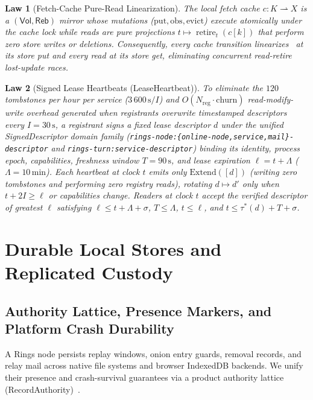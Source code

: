 \documentclass[journal]{IEEEtran}
\newtheorem{law}{Law}
\DeclareRobustCommand{\code}[1]{{\ttfamily\renewcommand{\_}{\textunderscore\allowbreak}#1}}
\begin{document}
\begin{law}[Fetch-Cache Pure-Read Linearization]\label{law:cache-linear}
The local fetch cache $c:K\rightharpoonup X$ is a $(\mathsf{Vol},\mathsf{Reb})$
mirror whose mutations ($\mathrm{put},\mathrm{obs},\mathrm{evict}$) execute
atomically under the cache lock while reads are pure projections
$t\mapsto\operatorname{retire}_t(c[k])$ that perform zero store writes or
deletions.  Consequently, every cache transition linearizes~\cite{HerlihyWing1990}
at its store put and every read at its store get, eliminating concurrent
read-retire lost-update races.
\end{law}

\begin{law}[Signed Lease Heartbeats (\code{LeaseHeartbeat})]\label{law:lease-heartbeat}
To eliminate the $120$ tombstones per hour per service ($3\,600\,\mathrm{s}/I$) and $O(N_{\mathrm{reg}}\cdot\mathrm{churn})$ read-modify-write overhead generated
when registrants overwrite timestamped descriptors every $I=30\,\mathrm{s}$,
a registrant signs a fixed lease descriptor $d$ under the unified \code{SignedDescriptor}
domain family (\texttt{rings-node:\allowbreak\{online-node,\allowbreak service,\allowbreak mail\}-descriptor} and
\texttt{rings-turn:service-descriptor}) binding its
identity, process epoch, capabilities, freshness window $T=90\,\mathrm{s}$, and
lease expiration $\ell=t+\Lambda$ ($\Lambda=10\,\mathrm{min}$).  Each heartbeat at
clock $t$ emits only $\mathrm{Extend}([d])$ (writing zero tombstones and
performing zero registry reads), rotating $d\mapsto d'$ only when $t+2I\ge\ell$
or capabilities change.  Readers at clock $t$ accept the verified descriptor of
greatest $\ell$ satisfying $\ell\le t+\Lambda+\sigma$, $T\le\Lambda$, $t\le\ell$,
and $t\le\tau^*(d)+T+\sigma$.
\end{law}

\section{Durable Local Stores and Replicated Custody}\label{sec:durable}

\subsection{Authority Lattice, Presence Markers, and Platform Crash Durability}

A Rings node persists replay windows, onion entry guards, removal records, and
relay mail across native file systems and browser IndexedDB backends.  We unify
their presence and crash-survival guarantees via a product authority lattice
(\code{RecordAuthority})~\cite{Pillai2014}.
\end{document}
